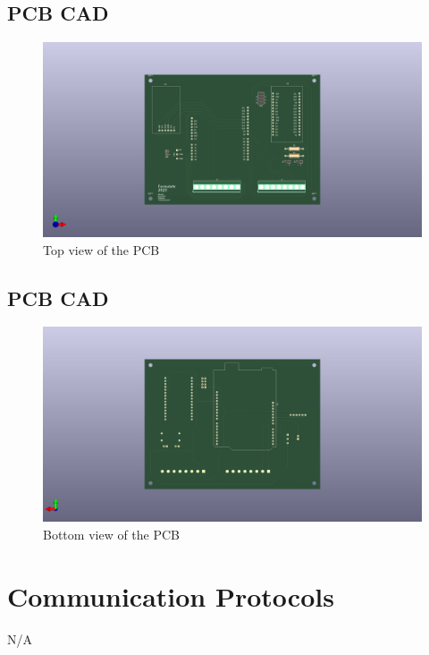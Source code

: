 \documentclass[12pt, titlepage]{article}
\begin{document}
\subsection{PCB CAD}
\begin{figure}[h!]
  \begin{center}
  \includegraphics[width=1.0\textwidth]{PCB_Front_View}
  \caption{Top view of the PCB}
  \end{center}
  \end{figure}
  \newpage

\subsection{PCB CAD}
\begin{figure}[h!]
  \begin{center}
  \includegraphics[width=1.0\textwidth]{PCB_Back_View}
  \caption{Bottom view of the PCB}
  \end{center}
  \end{figure}
  \newpage

\section{Communication Protocols}
N/A
\end{document}
